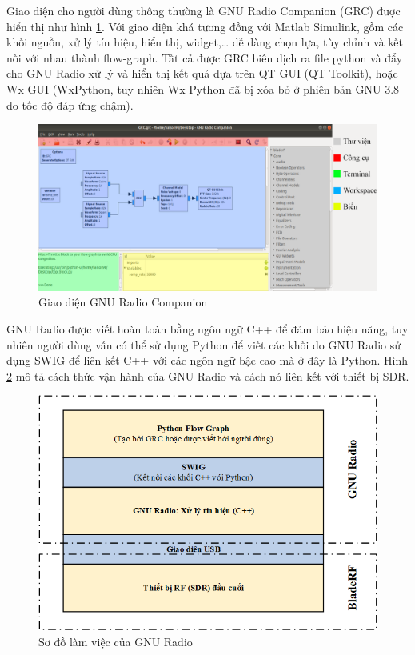 Giao diện cho người dùng thông thường là GNU Radio Companion (GRC) được hiển thị như hình \ref{fig:GNURadio}. Với giao diện khá tương đồng với Matlab Simulink, gồm các khối nguồn, xử lý tín hiệu, hiển thị, widget,… dễ dàng chọn lựa, tùy chỉnh và kết nối với nhau thành flow-graph. Tất cả được GRC biên dịch ra file python và đẩy cho GNU Radio xử lý và hiển thị kết quả dựa trên QT GUI (QT Toolkit), hoặc Wx GUI (WxPython, tuy nhiên Wx Python đã bị xóa bỏ ở phiên bản GNU 3.8 do tốc độ đáp ứng chậm).

\begin{figure} [!h]
	\centering
	\includegraphics[width=1\linewidth]{figures/GNURadio1.png}
	\caption{Giao diện GNU Radio Companion}
	\label{fig:GNURadio}
\end{figure}

GNU Radio được viết hoàn toàn bằng ngôn ngữ C++ để đảm bảo hiệu năng, tuy nhiên người dùng vẫn có thể sử dụng Python để viết các khối do GNU Radio sử dụng SWIG để liên kết C++ với các ngôn ngữ bậc cao mà ở đây là Python. Hình \ref{fig:SWIG} mô tả cách thức vận hành của GNU Radio và cách nó liên kết với thiết bị SDR.

\begin{figure} [!htb]
	\centering
	\includegraphics[width=0.9\linewidth]{figures/SWIG.png}
	\caption{Sơ đồ làm việc của GNU Radio}
	\label{fig:SWIG}
\end{figure}

